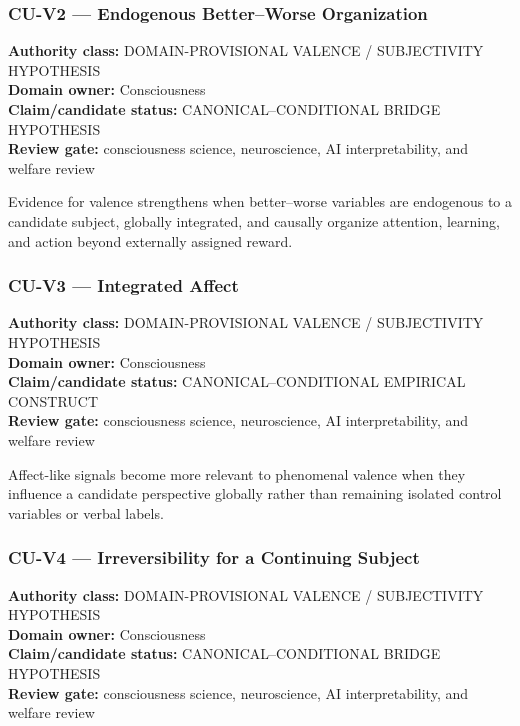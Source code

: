 \documentclass[
  11pt,
]{article}
\begin{document}
\subsubsection{CU-V2 --- Endogenous Better--Worse
Organization}\label{cu-v2-endogenous-betterworse-organization}

\textbf{Authority class:} DOMAIN-PROVISIONAL VALENCE / SUBJECTIVITY
HYPOTHESIS\\
\textbf{Domain owner:} Consciousness\\
\textbf{Claim/candidate status:} CANONICAL--CONDITIONAL BRIDGE
HYPOTHESIS\\
\textbf{Review gate:} consciousness science, neuroscience, AI
interpretability, and welfare review

Evidence for valence strengthens when better--worse variables are
endogenous to a candidate subject, globally integrated, and causally
organize attention, learning, and action beyond externally assigned
reward.

\subsubsection{CU-V3 --- Integrated
Affect}\label{cu-v3-integrated-affect}

\textbf{Authority class:} DOMAIN-PROVISIONAL VALENCE / SUBJECTIVITY
HYPOTHESIS\\
\textbf{Domain owner:} Consciousness\\
\textbf{Claim/candidate status:} CANONICAL--CONDITIONAL EMPIRICAL
CONSTRUCT\\
\textbf{Review gate:} consciousness science, neuroscience, AI
interpretability, and welfare review

Affect-like signals become more relevant to phenomenal valence when they
influence a candidate perspective globally rather than remaining
isolated control variables or verbal labels.

\subsubsection{CU-V4 --- Irreversibility for a Continuing
Subject}\label{cu-v4-irreversibility-for-a-continuing-subject}

\textbf{Authority class:} DOMAIN-PROVISIONAL VALENCE / SUBJECTIVITY
HYPOTHESIS\\
\textbf{Domain owner:} Consciousness\\
\textbf{Claim/candidate status:} CANONICAL--CONDITIONAL BRIDGE
HYPOTHESIS\\
\textbf{Review gate:} consciousness science, neuroscience, AI
interpretability, and welfare review
\end{document}

